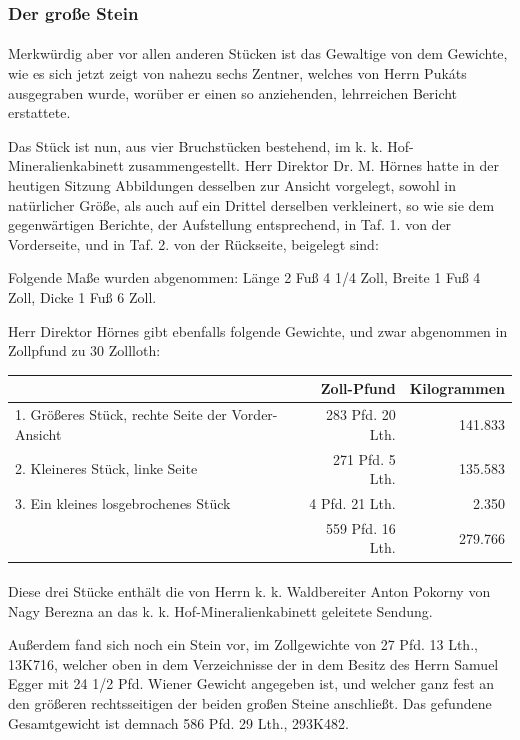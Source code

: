 \documentclass[a4paper, 11pt, oneside, german]{article}
\begin{document}
\subsubsection{Der große Stein}
\paragraph{}
Merkwürdig aber vor allen anderen Stücken ist das Gewaltige von dem Gewichte, wie es sich jetzt zeigt von nahezu sechs Zentner, welches von Herrn Pukáts ausgegraben wurde, worüber er einen so anziehenden, lehrreichen Bericht erstattete.

Das Stück ist nun, aus vier Bruchstücken bestehend, im k. k. Hof-Mineralienkabinett zusammengestellt. Herr Direktor Dr. M. Hörnes hatte in der heutigen Sitzung Abbildungen desselben zur Ansicht vorgelegt, sowohl in natürlicher Größe, als auch auf ein Drittel derselben verkleinert, so wie sie dem gegenwärtigen Berichte, der Aufstellung entsprechend, in Taf. 1. von der Vorderseite, und in Taf. 2. von der Rückseite, beigelegt sind:

Folgende Maße wurden abgenommen: Länge 2 Fuß 4 1/4 Zoll, Breite 1 Fuß 4 Zoll, Dicke 1 Fuß 6 Zoll.

Herr Direktor Hörnes gibt ebenfalls folgende Gewichte, und zwar abgenommen in Zollpfund zu 30 Zollloth:
\begin{table}[H]
    \centering\small
    \begin{tabular}{|p{45mm}|r|r|}
    \hline
        ~ & \textbf{Zoll-Pfund} & \textbf{Kilogrammen} \\ \hline
        1. Größeres Stück, rechte Seite der Vorder-Ansicht & 283 Pfd. 20 Lth. & 141.833 \\ \hline
        2. Kleineres Stück, linke Seite & 271 Pfd. 5 Lth. & 135.583 \\ \hline
        3. Ein kleines losgebrochenes Stück & 4 Pfd. 21 Lth. & 2.350 \\ \hline
        ~ & 559 Pfd. 16 Lth. & 279.766 \\ \hline
    \end{tabular}
\end{table}
\paragraph{}
Diese drei Stücke enthält die von Herrn k. k. Waldbereiter Anton Pokorny von Nagy Berezna an das k. k. Hof-Mineralienkabinett geleitete Sendung.

Außerdem fand sich noch ein Stein vor, im Zollgewichte von 27 Pfd. 13 Lth., 13K716, welcher oben in dem Verzeichnisse der in dem Besitz des Herrn Samuel Egger mit 24 1/2 Pfd. Wiener Gewicht angegeben ist, und welcher ganz fest an den größeren rechtsseitigen der beiden großen Steine anschließt. Das gefundene Gesamtgewicht ist demnach 586 Pfd. 29 Lth., 293K482.
\end{document}
